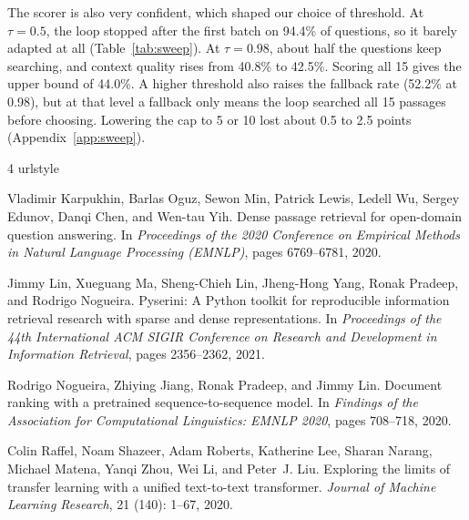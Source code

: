 \documentclass[11pt,twocolumn]{article}
\begin{document}
The scorer is also very confident, which shaped our choice of threshold. At $\tau=0.5$, the loop stopped after the first batch on 94.4\% of questions, so it barely adapted at all (Table~\ref{tab:sweep}). At $\tau=0.98$, about half the questions keep searching, and context quality rises from 40.8\% to 42.5\%. Scoring all 15 gives the upper bound of 44.0\%. A higher threshold also raises the fallback rate (52.2\% at 0.98), but at that level a fallback only means the loop searched all 15 passages before choosing. Lowering the cap to 5 or 10 lost about 0.5 to 2.5 points (Appendix~\ref{app:sweep}).
\clearpage
\begin{thebibliography}{4}
\providecommand{\natexlab}[1]{#1}
\providecommand{\url}[1]{\texttt{#1}}
\expandafter\ifx\csname urlstyle\endcsname\relax
  \providecommand{\doi}[1]{doi: #1}\else
  \providecommand{\doi}{doi: \begingroup \urlstyle{rm}\Url}\fi

Vladimir Karpukhin, Barlas Oguz, Sewon Min, Patrick Lewis, Ledell Wu, Sergey
  Edunov, Danqi Chen, and Wen-tau Yih.
\newblock Dense passage retrieval for open-domain question answering.
\newblock In \emph{Proceedings of the 2020 Conference on Empirical Methods in
  Natural Language Processing (EMNLP)}, pages 6769--6781, 2020.

Jimmy Lin, Xueguang Ma, Sheng-Chieh Lin, Jheng-Hong Yang, Ronak Pradeep, and
  Rodrigo Nogueira.
\newblock Pyserini: A {P}ython toolkit for reproducible information retrieval
  research with sparse and dense representations.
\newblock In \emph{Proceedings of the 44th International ACM SIGIR Conference
  on Research and Development in Information Retrieval}, pages 2356--2362,
  2021.

Rodrigo Nogueira, Zhiying Jiang, Ronak Pradeep, and Jimmy Lin.
\newblock Document ranking with a pretrained sequence-to-sequence model.
\newblock In \emph{Findings of the Association for Computational Linguistics:
  EMNLP 2020}, pages 708--718, 2020.

Colin Raffel, Noam Shazeer, Adam Roberts, Katherine Lee, Sharan Narang, Michael
  Matena, Yanqi Zhou, Wei Li, and Peter~J. Liu.
\newblock Exploring the limits of transfer learning with a unified text-to-text
  transformer.
\newblock \emph{Journal of Machine Learning Research}, 21
  (140): 1--67, 2020.

\end{thebibliography}
\appendix
\end{document}
